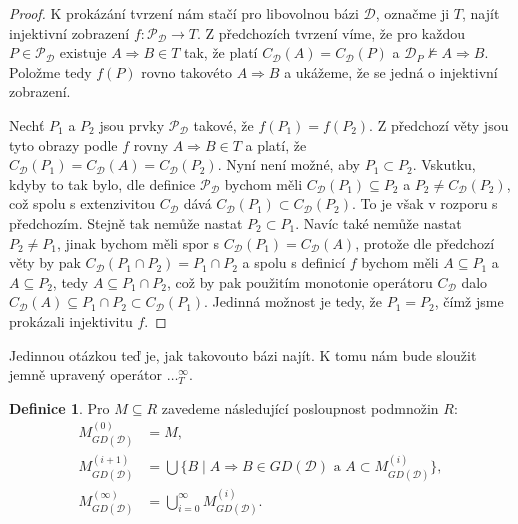 \documentclass{article}
\theoremstyle {definition}
\newtheorem{definition}{Definice}
\begin{document}
\begin{proof}
  K prokázání tvrzení nám stačí pro libovolnou bázi $\mathcal{D}$,
  označme ji $T$, najít injektivní zobrazení $f : \mathcal P_{\mathcal{D}}
  \rightarrow T$. Z předchozích tvrzení víme, že pro každou $P \in
  \mathcal P_{\mathcal{D}}$ existuje $A \Rightarrow B \in T$ tak, že platí
  $C_{\mathcal{D}}(A) = C_{\mathcal{D}}(P)$ a $\mathcal{D}_P
  \not\models A \Rightarrow B$. Položme tedy $f(P)$ rovno takovéto
  $A\Rightarrow B$ a ukážeme, že se jedná o injektivní zobrazení.

  Nechť $P_1$ a $P_2$ jsou prvky $\mathcal P_{\mathcal D}$ takové, že
  $f(P_1) = f(P_2)$. Z předchozí věty jsou tyto obrazy podle $f$ rovny
  $A\Rightarrow B\in T$ a platí, že $C_{\mathcal{D}}(P_1) =
  C_{\mathcal{D}}(A) = C_{\mathcal{D}}(P_2)$. Nyní není možné, aby
  $P_1 \subset P_2$. Vskutku, kdyby to tak bylo, dle definice
  $\mathcal P_{\mathcal D}$ bychom měli $C_{\mathcal{D}}(P_1)
  \subseteq P_2$ a $P_2\neq C_{\mathcal{D}}(P_2)$, což spolu s
  extenzivitou $C_{\mathcal D}$ dává $C_{\mathcal{D}}(P_1)\subset
  C_{\mathcal{D}}(P_2)$. To je však v rozporu s předchozím. Stejně tak
  nemůže nastat $P_2 \subset P_1$. Navíc také nemůže nastat $P_2 \neq
  P_1$, jinak bychom měli spor s $C_{\mathcal{D}}(P_1) =
  C_{\mathcal{D}}(A)$, protože dle předchozí věty by pak
  $C_{\mathcal{D}}(P_1\cap P_2) = P_1\cap P_2$ a spolu s definicí $f$
  bychom měli $A\subseteq P_1$ a $A\subseteq P_2$, tedy $A\subseteq
  P_1\cap P_2$, což by pak použitím monotonie operátoru
  $C_{\mathcal{D}}$ dalo $C_{\mathcal{D}}(A)\subseteq P_1\cap
  P_2\subset C_{\mathcal{D}}(P_1)$. Jedinná možnost je tedy, že $P_1 =
  P_2$, čímž jsme prokázali injektivitu $f$.
\end{proof}

Jedinnou otázkou teď je, jak takovouto bázi najít. K tomu nám bude
sloužit jemně upravený operátor $\dots^{\infty}_{T}$.

\begin {definition}
  Pro $M\subseteq R$ zavedeme následující posloupnost podmnožin
  $R$:
  \begin {align*}
    M^{(0)}_{GD(\mathcal{D})} &= M,\\
    M^{(i+1)}_{GD(\mathcal{D})} &=
    \bigcup\{B\mid A\Rightarrow B\in GD(\mathcal{D}) \text { a }
    A\subset M^{(i)}_{GD(\mathcal{D})}\},\\
    M^{(\infty)}_{GD(\mathcal{D})} &=
    \bigcup_{i=0}^{\infty}M^{(i)}_{GD(\mathcal{D})}.
  \end {align*}
\end {definition}
\end{document}
